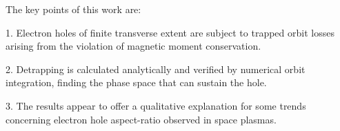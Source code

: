 The key points of this work are:

1. Electron holes of finite transverse extent are subject to trapped orbit
losses arising from the violation of magnetic moment conservation.

2. Detrapping is calculated analytically and verified by numerical
orbit integration, finding the phase space that can sustain the hole.

3. The results appear to offer a qualitative explanation for some
trends concerning electron hole aspect-ratio observed in space
plasmas.

